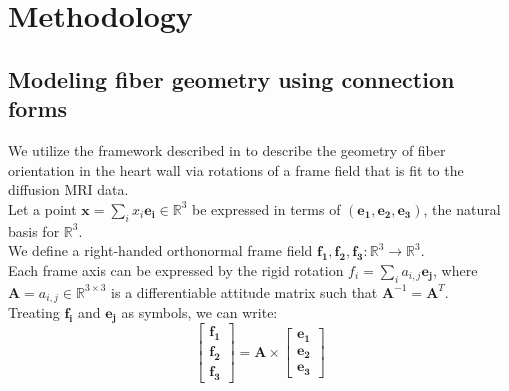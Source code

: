 \chapter{Methodology}

\section{Modeling fiber geometry using connection forms}

We utilize the framework described in \cite{de1990ventricular} to describe the geometry of fiber orientation in the heart wall via rotations of a frame field that is fit to the diffusion MRI data. \\
Let a point $\mathbf{x} = \sum_i{x_i\mathbf{e_i}} \in \mathbb{R}^3$ be expressed in terms of $(\mathbf{e_1}, \mathbf{e_2}, \mathbf{e_3})$, the natural basis for $\mathbb{R}^3$. \\
We define a right-handed orthonormal frame field $\mathbf{f_1},\mathbf{f_2},\mathbf{f_3} : \mathbb{R}^3 \to \mathbb{R}^3$. \\ 
Each frame axis can be expressed by the rigid rotation $f_i = \sum_i{a_{i,j}\mathbf{e_j}}$, where $\mathbf{A} = {a_{i,j}} \in \mathbb{R}^{3 \times 3}$ is a differentiable attitude matrix such that $\mathbf{A}^{-1} = \mathbf{A}^T$. \\
Treating $\mathbf{f_i}$ and $\mathbf{e_j}$ as symbols, we can write:
\begin{equation}
\begin{bmatrix}
    \mathbf{f_1} \\
    \mathbf{f_2} \\
    \mathbf{f_3}
\end{bmatrix} = \mathbf{A} \times \begin{bmatrix}
    \mathbf{e_1} \\
    \mathbf{e_2} \\
    \mathbf{e_3}
\end{bmatrix}
\end{equation}

